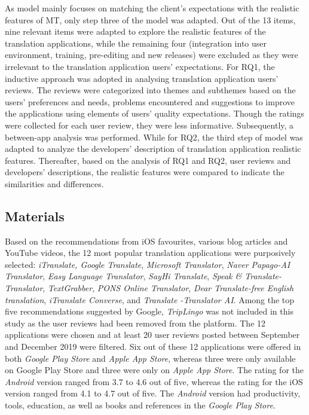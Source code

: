 \documentclass[english]{textolivre}
\begin{document}
As  model mainly focuses on matching the client’s expectations with the realistic features of MT, only step three of the model was adapted. Out of the 13 items, nine relevant items were adapted to explore the realistic features of the translation applications, while the remaining four (integration into user environment, training, pre-editing and new releases) were excluded as they were irrelevant to the translation application users’ expectations. For RQ1, the inductive approach was adopted in analysing translation application users’ reviews. The reviews were categorized into themes and subthemes based on the users’ preferences and needs, problems encountered and suggestions to improve the applications using  elements of users’ quality expectations. Though the ratings were collected for each user review, they were less informative. Subsequently, a between-app analysis was performed. While for RQ2, the third step of  model was adapted to analyze the developers’ description of translation application realistic features. Thereafter, based on the analysis of RQ1 and RQ2, user reviews and developers’ descriptions, the realistic features were compared to indicate the similarities and differences.

\subsection{Materials}\label{sec-autores}
Based on the recommendations from iOS favourites, various blog articles and YouTube videos, the 12 most popular translation applications were purposively selected: \textit{iTranslate, Google Translate}, \textit{Microsoft Translator}, \textit{Naver Papago-AI Translator}, \textit{Easy Language Translator}, \textit{SayHi Translate}, \textit{Speak \& Translate-Translator}, \textit{TextGrabber}, \textit{PONS Online Translator}, \textit{Dear Translate-free English translation}, \textit{iTranslate Converse}, and \textit{Translate -Translator AI}. Among the top five recommendations suggested by Google, \textit{TripLingo} was not included in this study as the user reviews had been removed from the platform. The 12 applications were chosen and at least 20 user reviews posted between September and December 2019 were filtered. Six out of these 12 applications were offered in both \textit{Google Play Store} and \textit{Apple App Store}, whereas three were only available on Google Play Store and three were only on \textit{Apple App Store}. The rating for the \textit{Android} version ranged from 3.7 to 4.6 out of five, whereas the rating for the iOS version ranged from 4.1 to 4.7 out of five. The \textit{Android} version had productivity, tools, education, as well as books and references in the \textit{Google Play Store}.
\end{document}
